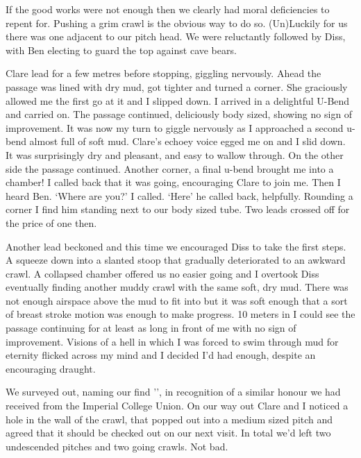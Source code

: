 If the good works were not enough then we clearly had moral deficiencies to repent for. Pushing a grim crawl is the obvious way to do so. (Un)Luckily for us there was one adjacent to our pitch head.  We were reluctantly followed by Diss, with Ben electing to guard the top against cave bears.

Clare lead for a few metres before stopping, giggling nervously. Ahead the passage was lined with dry mud, got tighter and turned a corner. She graciously allowed me the first go at it and I slipped down. I arrived in a delightful U-Bend and carried on. The passage continued, deliciously body sized, showing no sign of improvement. It was now my turn to giggle nervously as I approached a second u-bend almost full of soft mud. Clare’s echoey voice egged me on and I slid down. It was surprisingly dry and pleasant, and easy to wallow through. On the other side the passage continued. Another corner, a final  u-bend brought me into a chamber! I called back that it was going, encouraging Clare to join me. Then I heard Ben. 
‘Where are you?’ I called. 
‘Here’ he called back, helpfully. 
Rounding a corner I find him standing next to our body sized tube. Two leads crossed off for the price of one then.
 
Another lead beckoned and this time we encouraged Diss to take the first steps. A squeeze down into a slanted stoop that gradually deteriorated to an awkward crawl. A collapsed chamber offered us no easier going and I overtook Diss eventually finding another muddy crawl with the same soft, dry mud. There was not enough airspace above the mud to fit into but it was soft enough that a sort of breast stroke motion was enough to make progress. 10 meters in I could see the passage continuing for at least as long in front of me with no sign of improvement. Visions of a hell in which I was forced to swim through mud for eternity flicked across my mind and I decided I’d had enough, despite an encouraging draught.
 
We surveyed out, naming our find '', in recognition of a similar honour we had received from the Imperial College Union. On our way out Clare and I noticed a hole in the wall of the crawl, that popped out into a medium sized pitch and agreed that it should be checked out on our next visit. In total we’d left two undescended pitches and two going crawls. Not bad.
 
